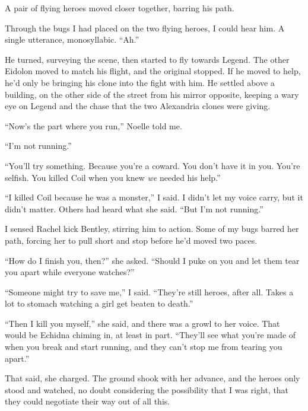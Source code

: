 A pair of flying heroes moved closer together, barring his path.



Through the bugs I had placed on the two flying heroes, I could hear him.  A single utterance, monosyllabic.  ``Ah.''



He turned, surveying the scene, then started to fly towards Legend.  The other Eidolon moved to match his flight, and the original stopped.  If he moved to help, he'd only be bringing his clone into the fight with him.  He settled above a building, on the other side of the street from his mirror opposite, keeping a wary eye on Legend and the chase that the two Alexandria clones were giving.



``Now's the part where you run,'' Noelle told me.



``I'm not running.''



``You'll try something.  Because you're a coward.  You don't have it in you.  You're selfish.  You killed Coil when you knew \emph{we} needed his help.''



``I killed Coil because he was a monster,'' I said.  I didn't let my voice carry, but it didn't matter.  Others had heard what she said.  ``But I'm not running.''



I sensed Rachel kick Bentley, stirring him to action.  Some of my bugs barred her path, forcing her to pull short and stop before he'd moved two paces.



``How do I finish you, then?'' she asked.  ``Should I puke on you and let them tear you apart while everyone watches?''



``Someone might try to save me,'' I said.  ``They're still heroes, after all.  Takes a lot to stomach watching a girl get beaten to death.''



``Then I kill you myself,'' she said, and there was a growl to her voice.  That would be Echidna chiming in, at least in part.  ``They'll see what you're made of when you break and start running, and they can't stop me from tearing you apart.''



That said, she charged.  The ground shook with her advance, and the heroes only stood and watched, no doubt considering the possibility that I was right, that they could negotiate their way out of all this.




